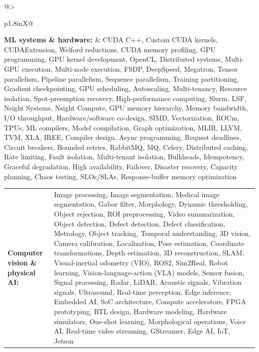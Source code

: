 \documentclass[letterpaper,11pt]{article}
\begin{document}
\par\vspace{2pt}
\begin{tabularx}{\linewidth}{@{}>{\raggedright\arraybackslash}p{1.8in}X@{}}
\textbf{ML systems \& hardware:} & \footnotesize{CUDA C++, Custom CUDA kernels, CUDAExtension, Welford reductions, CUDA memory profiling, GPU programming, GPU kernel development, OpenCL, Distributed systems, Multi-GPU execution, Multi-node execution, FSDP, DeepSpeed, Megatron, Tensor parallelism, Pipeline parallelism, Sequence parallelism, Training partitioning, Gradient checkpointing, GPU scheduling, Autoscaling, Multi-tenancy, Resource isolation, Spot-preemption recovery, High-performance computing, Slurm, LSF, Nsight Systems, Nsight Compute, GPU memory hierarchy, Memory bandwidth, I/O throughput, Hardware/software co-design, SIMD, Vectorization, ROCm, TPUs, ML compilers, Model compilation, Graph optimization, MLIR, LLVM, TVM, XLA, IREE, Compiler design, Async programming, Request deadlines, Circuit breakers, Bounded retries, RabbitMQ, MQ, Celery, Distributed caching, Rate limiting, Fault isolation, Multi-tenant isolation, Bulkheads, Idempotency, Graceful degradation, High availability, Failover, Disaster recovery, Capacity planning, Chaos testing, SLOs/SLAs, Response-buffer memory optimization}\\
\end{tabularx}
\par\vspace{2pt}
\begin{tabularx}{\linewidth}{@{}>{\raggedright\arraybackslash}p{1.8in}X@{}}
\textbf{Computer vision \& physical AI:} & \footnotesize{Image processing, Image segmentation, Medical image segmentation, Gabor filter, Morphology, Dynamic thresholding, Object rejection, ROI preprocessing, Video summarization, Object detection, Defect detection, Defect classification, Metrology, Object tracking, Temporal understanding, 3D vision, Camera calibration, Localization, Pose estimation, Coordinate transformations, Depth estimation, 3D reconstruction, SLAM, Visual-inertial odometry (VIO), ROS2, Sim2Real, Robot learning, Vision-language-action (VLA) models, Sensor fusion, Signal processing, Radar, LiDAR, Acoustic signals, Vibration signals, Ultrasound, Real-time perception, Edge inference, Embedded AI, SoC architecture, Compute accelerators, FPGA prototyping, RTL design, Hardware modeling, Hardware simulators, One-shot learning, Morphological operations, Voice AI, Real-time video streaming, GStreamer, Edge AI, IoT, Jetson}\\
\end{tabularx}
\end{document}
